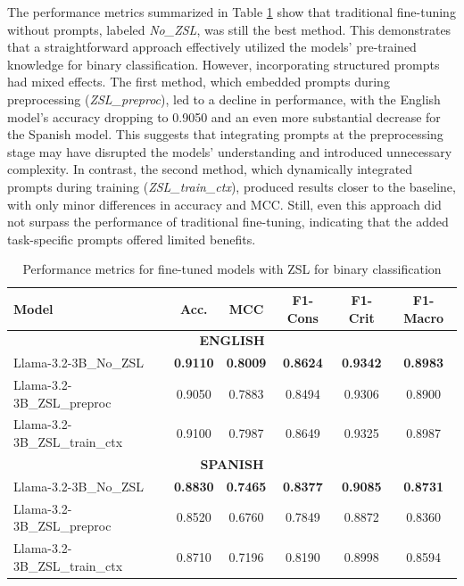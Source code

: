 \documentclass{Configuration_Files/PoliMi3i_thesis}
\begin{document}
The performance metrics summarized in Table \ref{tab:performance_fi_with_ZSL_T1} show that traditional fine-tuning without prompts, labeled \textit{No\_ZSL}, was still the best method. This demonstrates that a straightforward approach effectively utilized the models' pre-trained knowledge for binary classification. However, incorporating structured prompts had mixed effects. The first method, which embedded prompts during preprocessing (\textit{ZSL\_preproc}), led to a decline in performance, with the English model's accuracy dropping to 0.9050 and an even more substantial decrease for the Spanish model. This suggests that integrating prompts at the preprocessing stage may have disrupted the models' understanding and introduced unnecessary complexity. In contrast, the second method, which dynamically integrated prompts during training (\textit{ZSL\_train\_ctx}), produced results closer to the baseline, with only minor differences in accuracy and MCC. Still, even this approach did not surpass the performance of traditional fine-tuning, indicating that the added task-specific prompts offered limited benefits.


\begin{table}[H]
\centering
\small
\begin{tabular}{lccccc}
\hline
\textbf{Model} & \textbf{Acc.} & \textbf{MCC} & \textbf{F1-Cons} & \textbf{F1-Crit} & \textbf{F1-Macro}\\
\hline
\multicolumn{6}{c}{\textbf{ENGLISH}} \\
\hline
Llama-3.2-3B\_No\_ZSL & \textbf{0.9110} & \textbf{0.8009} & \textbf{0.8624} & \textbf{0.9342} & \textbf{0.8983}   \\
Llama-3.2-3B\_ZSL\_preproc & 0.9050 & 0.7883 & 0.8494 & 0.9306 & 0.8900  \\
Llama-3.2-3B\_ZSL\_train\_ctx & 0.9100 & 0.7987 & 0.8649 & 0.9325 & 0.8987  \\
\hline
\multicolumn{6}{c}{\textbf{SPANISH}} \\
\hline
Llama-3.2-3B\_No\_ZSL & \textbf{0.8830} & \textbf{0.7465} & \textbf{0.8377} & \textbf{0.9085} & \textbf{0.8731}   \\
Llama-3.2-3B\_ZSL\_preproc & 0.8520 & 0.6760 & 0.7849 & 0.8872 & 0.8360  \\
Llama-3.2-3B\_ZSL\_train\_ctx & 0.8710 & 0.7196 & 0.8190 & 0.8998 & 0.8594  \\
\hline
\end{tabular}
\caption{Performance metrics for fine-tuned models with ZSL for binary classification}
\label{tab:performance_fi_with_ZSL_T1}
\end{table}
\FloatBarrier
\end{document}
